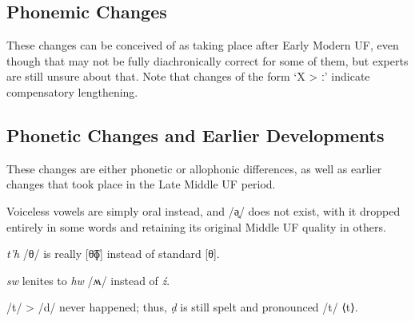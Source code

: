 \documentclass[a4paper, 12pt, twoside, openright, final]{book}
\newlength{\EnumItemSep} \EnumItemSep-3pt
\newenvironment { enum } [1] [0] {
    \vspace { -.5em }
    \settowidth \leftmargini { 99.\hskip\labelsep }
    \begin { enumerate }
    \setcounter { enumi } { #1 }
    \itemsep \EnumItemSep
} {
    \end { enumerate }
    \vspace { -.5em }
}
\let \w \textit
\begin{document}
\subsection{Phonemic Changes}
These changes can be conceived of as taking place after Early Modern UF, even though that may not be fully diachronically
correct for some of them, but experts are still unsure about that. Note that changes of the form ‘X > ː’ indicate compensatory lengthening.

\subsection{Phonetic Changes and Earlier Developments}
These changes are either phonetic or allophonic differences, as well as earlier changes that took place in the Late
Middle UF period.
\begin{items}
    \item Voiceless vowels are simply oral instead, and /ə̥/ does not exist, with it dropped entirely in some words
           and retaining its original Middle UF quality in others.
    \item \w{t’h} /θ/ is really [θ͡ɸ] instead of standard [θ].
    \item \w{sw} lenites to \w{hw} /ʍ/ instead of \w{ź}.
    \item /t/ > /d/ never happened; thus, \w{ḍ} is still spelt and pronounced /t/ ⟨t⟩.
\end{items}
\end{document}
